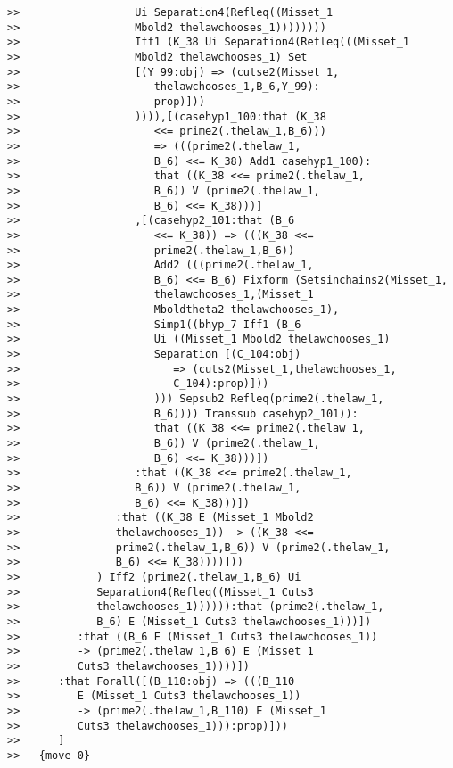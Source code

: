 \documentclass[12pt]{article}
\begin{document}
\begin{verbatim}
>>                  Ui Separation4(Refleq((Misset_1
>>                  Mbold2 thelawchooses_1))))))))
>>                  Iff1 (K_38 Ui Separation4(Refleq(((Misset_1
>>                  Mbold2 thelawchooses_1) Set
>>                  [(Y_99:obj) => (cutse2(Misset_1,
>>                     thelawchooses_1,B_6,Y_99):
>>                     prop)]))
>>                  )))),[(casehyp1_100:that (K_38
>>                     <<= prime2(.thelaw_1,B_6)))
>>                     => (((prime2(.thelaw_1,
>>                     B_6) <<= K_38) Add1 casehyp1_100):
>>                     that ((K_38 <<= prime2(.thelaw_1,
>>                     B_6)) V (prime2(.thelaw_1,
>>                     B_6) <<= K_38)))]
>>                  ,[(casehyp2_101:that (B_6
>>                     <<= K_38)) => (((K_38 <<=
>>                     prime2(.thelaw_1,B_6))
>>                     Add2 (((prime2(.thelaw_1,
>>                     B_6) <<= B_6) Fixform (Setsinchains2(Misset_1,
>>                     thelawchooses_1,(Misset_1
>>                     Mboldtheta2 thelawchooses_1),
>>                     Simp1((bhyp_7 Iff1 (B_6
>>                     Ui ((Misset_1 Mbold2 thelawchooses_1)
>>                     Separation [(C_104:obj)
>>                        => (cuts2(Misset_1,thelawchooses_1,
>>                        C_104):prop)]))
>>                     ))) Sepsub2 Refleq(prime2(.thelaw_1,
>>                     B_6)))) Transsub casehyp2_101)):
>>                     that ((K_38 <<= prime2(.thelaw_1,
>>                     B_6)) V (prime2(.thelaw_1,
>>                     B_6) <<= K_38)))])
>>                  :that ((K_38 <<= prime2(.thelaw_1,
>>                  B_6)) V (prime2(.thelaw_1,
>>                  B_6) <<= K_38)))])
>>               :that ((K_38 E (Misset_1 Mbold2
>>               thelawchooses_1)) -> ((K_38 <<=
>>               prime2(.thelaw_1,B_6)) V (prime2(.thelaw_1,
>>               B_6) <<= K_38))))]))
>>            ) Iff2 (prime2(.thelaw_1,B_6) Ui
>>            Separation4(Refleq((Misset_1 Cuts3
>>            thelawchooses_1)))))):that (prime2(.thelaw_1,
>>            B_6) E (Misset_1 Cuts3 thelawchooses_1)))])
>>         :that ((B_6 E (Misset_1 Cuts3 thelawchooses_1))
>>         -> (prime2(.thelaw_1,B_6) E (Misset_1
>>         Cuts3 thelawchooses_1))))])
>>      :that Forall([(B_110:obj) => (((B_110
>>         E (Misset_1 Cuts3 thelawchooses_1))
>>         -> (prime2(.thelaw_1,B_110) E (Misset_1
>>         Cuts3 thelawchooses_1))):prop)]))
>>      ]
>>   {move 0}



\end{verbatim}
\end{document}
